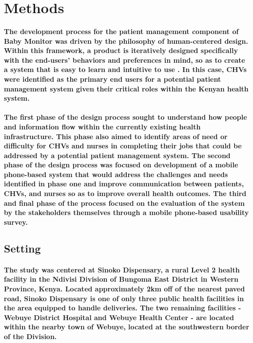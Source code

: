 \section{Methods}


\paragraph{The development process for the patient management component of Baby Monitor was driven by the philosophy of human-centered design. Within this framework, a product is iteratively designed specifically with the end-users' behaviors and preferences in mind, so as to create a system that is easy to learn and intuitive to use \citep{Oviatt2006}. In this case, CHVs  were identified as the primary end users for a potential patient management system given their critical roles within the Kenyan health system.}

\paragraph{The first phase of the design process sought to understand how people and information flow within the currently existing health infrastructure. This phase also aimed to identify areas of need or difficulty for CHVs and nurses in completing their jobs that could be addressed by a potential patient management system. The second phase of the design process was focused on development of a mobile phone-based system that would address the challenges and needs identified in phase one and improve communication between patients, CHVs, and nurses so as to improve overall health outcomes. The third and final phase of the process focused on the evaluation of the system by the stakeholders themselves through a mobile phone-based usability survey.}

\subsection{Setting}

\paragraph{The study was centered at Sinoko Dispensary, a rural Level 2 health facility in the Ndivisi Division of Bungoma East District in Western Province, Kenya. Located approximately 2km off of the nearest paved road, Sinoko Dispensary is one of only three public health facilities in the area equipped to handle deliveries. The two remaining facilities - Webuye District Hospital and Webuye Health Center - are located within the nearby town of Webuye, located at the southwestern border of the Division. }

